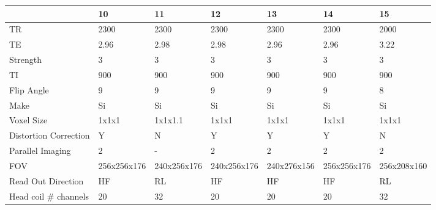 \begin{table}
\centering
\iflatexml
\begin{tabular}{lllllll}
\toprule
{} & 10 & 11 & 12 & 13 & 14 & 15 \\
\midrule
TR                    &                 2300 &                 2300 &               2300 &                2300 &                2300 &                2000 \\
TE                    &                 2.96 &                 2.98 &               2.98 &                2.96 &                2.96 &                3.22 \\
Strength              &                    3 &                    3 &                  3 &                   3 &                   3 &                   3 \\
TI                    &                  900 &                  900 &                900 &                 900 &                 900 &                 900 \\
Flip Angle            &                    9 &                    9 &                  9 &                   9 &                   9 &                   8 \\
Make                  &                   Si &                   Si &                 Si &                  Si &                  Si &                  Si \\
Voxel Size            &                1x1x1 &              1x1x1.1 &              1x1x1 &               1x1x1 &               1x1x1 &               1x1x1 \\
Distortion Correction &                    Y &                    N &                  Y &                   Y &                   Y &                   N \\
Parallel Imaging      &                    2 &                    - &                  2 &                   2 &                   2 &                   2 \\
FOV                   &          256x256x176 &          240x256x176 &        240x256x176 &         240x276x156 &         256x256x176 &         256x208x160 \\
Read Out Direction    &                   HF &                   RL &                 HF &                  HF &                  HF &                  RL \\
Head coil \# channels  &                   20 &                   32 &                 20 &                  20 &                  20 &                  32 \\

\end{tabular}
\end{table}
